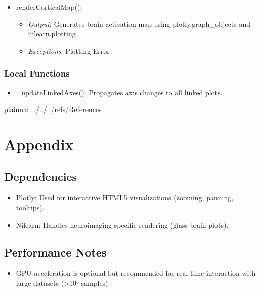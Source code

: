 \documentclass[12pt, titlepage]{article}
\begin{document}
\begin{itemize}
\item renderCorticalMap():

\begin{itemize}
\item \textit{Output}: Generates brain activation map using plotly.graph\_objects and nilearn.plotting


\item \textit{Exceptions}: Plotting Error


\end{itemize}

\end{itemize}



\subsubsection{Local Functions}

\begin{itemize}
\item \_updateLinkedAxes(): Propagates axis changes to all linked plots.


\end{itemize}

\newpage

 {plainnat}
 {../../../refs/References}

\newpage

\section{Appendix} \label{Appendix}

\subsection{ Dependencies}
\begin{itemize}
\item Plotly: Used for interactive HTML5 visualizations (zooming, panning, tooltips).


\item Nilearn: Handles neuroimaging-specific rendering (glass brain plots).


\end{itemize}
\subsection{Performance Notes}
\begin{itemize}
\item GPU acceleration is optional but recommended for real-time interaction with large datasets (>10⁶ samples).


\end{itemize}
\end{document}
